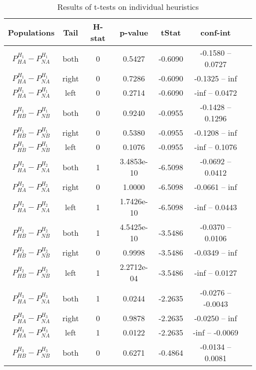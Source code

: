 \documentclass[../main.tex]{subfiles}
\begin{document}
\begin{table}
    \centering
    \caption{Results of t-tests on individual heuristics}
        \begin{tabular}{ccccccc}
        \hline
            Populations                 & Tail   &H-stat   & p-value    & tStat & conf-int \\ 
        \hline                
            $P^{H_1}_{HA}-P^{H_1}_{NA}$    & both  & 0 & 0.5427    & -0.6090  & -0.1580 -- 0.0727 \\
            $P^{H_1}_{HA}-P^{H_1}_{NA}$    & right & 0 & 0.7286    & -0.6090  & -0.1325 -- inf    \\
            $P^{H_1}_{HA}-P^{H_1}_{NA}$    & left  & 0 & 0.2714    & -0.6090  & -inf -- 0.0472    \\
            $P^{H_1}_{HB}-P^{H_1}_{NB}$    & both  & 0 & 0.9240    & -0.0955  & -0.1428 -- 0.1296 \\
            $P^{H_1}_{HB}-P^{H_1}_{NB}$    & right & 0 & 0.5380    & -0.0955  & -0.1208 -- inf    \\
            $P^{H_1}_{HB}-P^{H_1}_{NB}$    & left  & 0 & 0.1076    & -0.0955  & -inf -- 0.1076    \\
            $P^{H_2}_{HA}-P^{H_2}_{NA}$    & both  & 1 & 3.4853e-10& -6.5098  & -0.0692 -- 0.0412 \\
            $P^{H_2}_{HA}-P^{H_2}_{NA}$    & right & 0 & 1.0000    & -6.5098  & -0.0661 -- inf    \\
            $P^{H_2}_{HA}-P^{H_2}_{NA}$    & left  & 1 & 1.7426e-10& -6.5098  & -inf -- 0.0443    \\
            $P^{H_2}_{HB}-P^{H_2}_{NB}$    & both  & 1 & 4.5425e-10& -3.5486  & -0.0370 -- 0.0106 \\
            $P^{H_2}_{HB}-P^{H_2}_{NB}$    & right & 0 & 0.9998    & -3.5486  & -0.0349 -- inf    \\
            $P^{H_2}_{HB}-P^{H_2}_{NB}$    & left  & 1 & 2.2712e-04& -3.5486  & -inf -- 0.0127    \\
            $P^{H_3}_{HA}-P^{H_3}_{NA}$    & both  & 1 & 0.0244    & -2.2635  & -0.0276 -- -0.0043\\
            $P^{H_3}_{HA}-P^{H_3}_{NA}$    & right & 0 & 0.9878    & -2.2635  & -0.0250 -- inf    \\
            $P^{H_3}_{HA}-P^{H_3}_{NA}$    & left  & 1 & 0.0122    & -2.2635  & -inf -- -0.0069  \\
            $P^{H_3}_{HB}-P^{H_3}_{NB}$    & both  & 0 & 0.6271    & -0.4864  & -0.0134 -- 0.0081  \\

\end{tabular}
\end{table}
\end{document}
